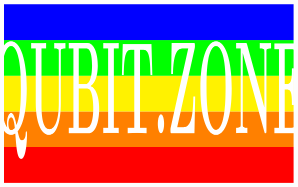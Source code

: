 \documentclass[aspectratio=169]{beamer}
\begin{document}
{
\begin{frame}
\vspace{-20pt}
\[
\hspace{-2cm}
\begin{tikzpicture}[xscale=1.2, yscale=1.8]
\foreach \x/\y in {0/red,1/orange,2/yellow,3/green,4/blue} {
  \path [fill=\y] (0,\x) rectangle +(\textwidth,1);
}
\path [use as bounding box] (current bounding box.south west) rectangle (current bounding box.north east);
\node [scale=2.5, white, yscale=3.04] at (0.5*\textwidth,2.29) {\Huge\bf QUBIT.ZONE};
\end{tikzpicture}
\hspace{-2cm}
\]

\end{frame}
}

\addtocounter{framenumber}{-1}



\end{document}
